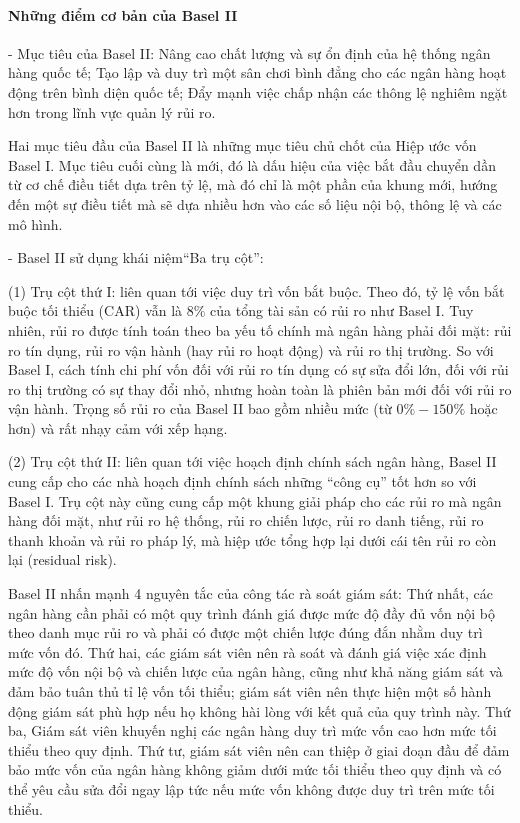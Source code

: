\paragraph{Những điểm cơ bản của Basel II}

- Mục tiêu của Basel II: Nâng cao chất lượng và sự ổn định của hệ thống ngân hàng quốc tế; Tạo lập và duy trì một sân chơi bình đẳng cho các ngân hàng hoạt động trên bình diện quốc tế; Đẩy mạnh việc chấp nhận các thông lệ nghiêm ngặt hơn trong lĩnh vực quản lý rủi ro.

Hai mục tiêu đầu của Basel II là những mục tiêu chủ chốt của Hiệp ước vốn Basel I. Mục tiêu cuối cùng là mới, đó là dấu hiệu của việc bắt đầu chuyển dần từ cơ chế điều tiết dựa trên tỷ lệ, mà đó chỉ là một phần của khung mới, hướng đến một sự điều tiết mà sẽ dựa nhiều hơn vào các số liệu nội bộ, thông lệ và các mô hình.

- Basel II sử dụng khái niệm“Ba trụ cột”:

(1) Trụ cột thứ I: liên quan tới việc duy trì vốn bắt buộc. Theo đó, tỷ lệ vốn bắt buộc tối thiểu (CAR) vẫn là $8\%$ của tổng tài sản có rủi ro như Basel I. Tuy nhiên, rủi ro được tính toán theo ba yếu tố chính mà ngân hàng phải đối mặt: rủi ro tín dụng, rủi ro vận hành (hay rủi ro hoạt động) và rủi ro thị trường. So với Basel I, cách tính chi phí vốn đối với rủi ro tín dụng có sự sửa đổi lớn, đối với rủi ro thị trường có sự thay đổi nhỏ, nhưng hoàn toàn là phiên bản mới đối với rủi ro vận hành. Trọng số rủi ro của Basel II bao gồm nhiều mức (từ $0\% -150\%$ hoặc hơn) và rất nhạy cảm với xếp hạng.

(2) Trụ cột thứ II: liên quan tới việc hoạch định chính sách ngân hàng, Basel II cung cấp cho các nhà hoạch định chính sách những “công cụ” tốt hơn so với Basel I. Trụ cột này cũng cung cấp một khung giải pháp cho các rủi ro mà ngân hàng đối mặt, như rủi ro hệ thống, rủi ro chiến lược, rủi ro danh tiếng, rủi ro thanh khoản và rủi ro pháp lý, mà hiệp ước tổng hợp lại dưới cái tên rủi ro còn lại (residual risk).

Basel II nhấn mạnh 4 nguyên tắc của công tác rà soát giám sát: Thứ nhất, các ngân hàng cần phải có một quy trình đánh giá được mức độ đầy đủ vốn nội bộ theo danh mục rủi ro và phải có được một chiến lược đúng đắn nhằm duy trì mức vốn đó. Thứ hai, các giám sát viên nên rà soát và đánh giá việc xác định mức độ vốn nội bộ và chiến lược của ngân hàng, cũng như khả năng giám sát và đảm bảo tuân thủ tỉ lệ vốn tối thiểu; giám sát viên nên thực hiện một số hành động giám sát phù hợp nếu họ không hài lòng với kết quả của quy trình này. Thứ ba, Giám sát viên khuyến nghị các ngân hàng duy trì mức vốn cao hơn mức tối thiểu theo quy định. Thứ tư, giám sát viên nên can thiệp ở giai đoạn đầu để đảm bảo mức vốn của ngân hàng không giảm dưới mức tối thiểu theo quy định và có thể yêu cầu sửa đổi ngay lập tức nếu mức vốn không được duy trì trên mức tối thiểu.

